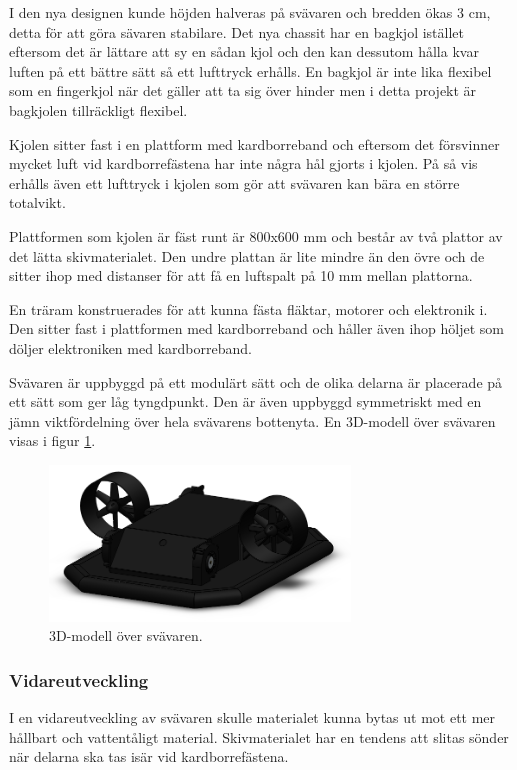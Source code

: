I den nya designen
kunde höjden halveras på svävaren och bredden ökas 3 cm, detta för att göra
sävaren stabilare. Det nya chassit har en bagkjol istället
eftersom det är lättare att sy en sådan kjol och den kan dessutom hålla kvar
luften på ett bättre sätt så ett lufttryck erhålls. En bagkjol är inte lika
flexibel som en fingerkjol när det gäller att ta sig över hinder men i detta
projekt är bagkjolen tillräckligt flexibel.

Kjolen sitter fast i en plattform med kardborreband och eftersom det försvinner
mycket luft vid kardborrefästena har inte några hål gjorts i kjolen. På så vis
erhålls även ett lufttryck i kjolen som gör att svävaren kan bära en större
totalvikt.

Plattformen som kjolen är fäst runt är 800x600 mm och består av två
plattor av det lätta skivmaterialet. Den undre plattan är lite mindre än den
övre och de sitter ihop med distanser för att få en luftspalt på 10 mm mellan
plattorna.

En träram konstruerades för att kunna fästa fläktar, motorer och elektronik
i. Den sitter fast i plattformen med kardborreband och håller även ihop höljet
som döljer elektroniken med kardborreband.

Svävaren är uppbyggd på ett modulärt sätt och de olika delarna är placerade på
ett sätt som ger låg tyngdpunkt. Den är även uppbyggd symmetriskt med en jämn
viktfördelning över hela svävarens bottenyta. En 3D-modell över svävaren visas i
figur \ref{fig:CAD_Hover}.

\begin{figure}[htbp!] 
\centering 
\includegraphics[width=8cm]{../includes/figures/CAD_Hovercraft.png} 
\caption{3D-modell över svävaren.} 
\label{fig:CAD_Hover} 
\end{figure}

\subsubsection{Vidareutveckling}
I en vidareutveckling av svävaren skulle materialet kunna bytas ut mot ett mer
hållbart och vattentåligt material. Skivmaterialet har en tendens att slitas
sönder när delarna ska tas isär vid kardborrefästena.

